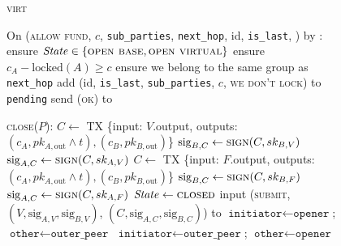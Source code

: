 \begin{figure}[H]
\begin{processbox}{\textsc{virt}}
\begin{algorithmic}[1]
      \State {}
      \State On (\textsc{allow fund}, $c$, \texttt{sub\_parties},
      \texttt{next\_hop}, id, \texttt{is\_last}, \charlie) by \bob:
      \Indent
        \State ensure $\mathit{State} \in \{\textsc{open base}, \textsc{open
        virtual}\}$
        \State ensure $c_A - \mathrm{locked}(A) \geq c$
        \State ensure we belong to the same group as \texttt{next\_hop}
        \State add (id, \texttt{is\_last}, \texttt{sub\_parties}, $c$,
        \textsc{we don't lock}) to \texttt{pending}
        \State send (\textsc{ok}) to \bob
      \EndIndent
      \Statex

      \State \textsc{close}($P$):
            \State {}
            \State $C \gets$ TX \{input: $V$.output, outputs: $(c_A, pk_{A,
            \mathrm{out}} \wedge t), (c_B, pk_{B, \mathrm{out}})$\}
            \State $\mathrm{sig}_{B, C} \gets \textsc{sign}(C, sk_{B, V})$
            \State $\mathrm{sig}_{A, C} \gets \textsc{sign}(C, sk_{A, V})$
          \Else
            \State $C \gets$ TX \{input: $F$.output, outputs: $(c_A, pk_{A,
            \mathrm{out}} \wedge t), (c_B, pk_{B, \mathrm{out}})$\}
            \State $\mathrm{sig}_{B, C} \gets \textsc{sign}(C, sk_{B, F})$
            \State $\mathrm{sig}_{A, C} \gets \textsc{sign}(C, sk_{A, F})$
          \EndIf
        \EndIf \: 
        \State $\mathit{State} \gets \textsc{closed}$
          \State input (\textsc{submit}, $(V, \mathrm{sig}_{A, V},
          \mathrm{sig}_{B, V})$, $(C, \mathrm{sig}_{A, C}, \mathrm{sig}_{B,
          C})$) to \ledger
        \Else \: 
            \State $\texttt{initiator} \gets \texttt{opener}$; $\texttt{other}
            \gets \texttt{outer\_peer}$
          \Else \: 
            \State $\texttt{initiator} \gets \texttt{outer\_peer}$;
            $\texttt{other} \gets \texttt{opener}$
          \EndIf

\end{algorithmic}
\end{processbox}
\end{figure}
